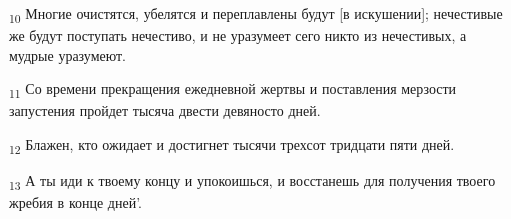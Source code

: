 \begin{tcolorbox}
\textsubscript{10} Многие очистятся, убелятся и переплавлены будут [в искушении]; нечестивые же будут поступать нечестиво, и не уразумеет сего никто из нечестивых, а мудрые уразумеют.
\end{tcolorbox}
\begin{tcolorbox}
\textsubscript{11} Со времени прекращения ежедневной жертвы и поставления мерзости запустения пройдет тысяча двести девяносто дней.
\end{tcolorbox}
\begin{tcolorbox}
\textsubscript{12} Блажен, кто ожидает и достигнет тысячи трехсот тридцати пяти дней.
\end{tcolorbox}
\begin{tcolorbox}
\textsubscript{13} А ты иди к твоему концу и упокоишься, и восстанешь для получения твоего жребия в конце дней'.
\end{tcolorbox}
